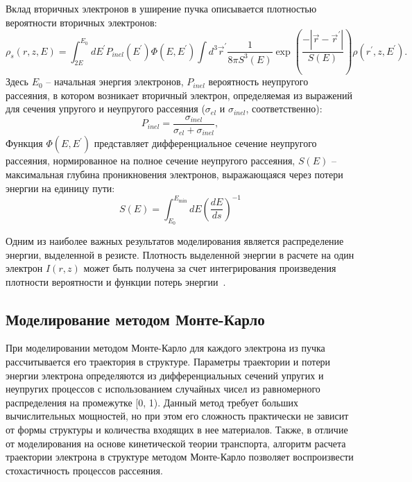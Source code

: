 Вклад вторичных электронов в уширение пучка описывается плотностью вероятности вторичных электронов:
\begin{equation} \label{eq:Boltzman_13_0}
	\rho_s(r, z, E)=\int_{2 E}^{E_0} d E^{\prime} P_{inel}\left(E^{\prime}\right) \Phi\left(E, E^{\prime}\right) \int d^3 \vec{r}^{\prime} \frac{1}{8 \pi S^3(E)} \exp \left(\frac{-\left|\vec{r}-\vec{r}^{\prime}\right|}{S(E)}\right) \rho\left(r^{\prime}, z, E^{\prime}\right).
\end{equation}
Здесь $E_0$ -- начальная энергия электронов, $P_{inel}$ вероятность неупругого рассеяния, в котором возникает вторичный электрон, определяемая из выражений для сечения упругого и неупругого рассеяния ($\sigma_{el}$ и $\sigma_{inel}$, соответственно):
\begin{equation} \label{eq:Boltzman_13}
	P_{inel}=\frac{\sigma_{inel}}{\sigma_{el}+\sigma_{inel}},
\end{equation}
Функция $\Phi\left(E, E^{\prime}\right)$ представляет дифференциальное сечение неупругого рассеяния, нормированное на полное сечение неупругого рассеяния, $S(E)$ -- максимальная глубина проникновения электронов, выражающаяся через потери энергии на единицу пути:
\begin{equation} \label{eq:Boltzman_14}
	S(E)=\int_{E_0}^{E_{\min }} d E\left(\frac{d E}{d s}\right)^{-1}
\end{equation}

Одним из наиболее важных результатов моделирования является распределение энергии, выделенной в резисте. Плотность выделенной энергии в расчете на один электрон $I(r,z)$ может быть получена за счет интегрирования произведения плотности вероятности и функции потерь энергии~\cite{ME_rev_64}.


\subsection{Моделирование методом Монте-Карло}
При моделировании методом Монте-Карло для каждого электрона из пучка рассчитывается его траектория в структуре. Параметры траектории и потери энергии электрона определяются из дифференциальных сечений упругих и неупругих процессов с использованием случайных чисел из равномерного распределения на промежутке [0, 1). Данный метод требует больших вычислительных мощностей, но при этом его сложность практически не зависит от формы структуры и количества входящих в нее материалов. Также, в отличие от моделирования на основе кинетической теории транспорта, алгоритм расчета траектории электрона в структуре методом Монте-Карло позволяет воспроизвести стохастичность процессов рассеяния.

